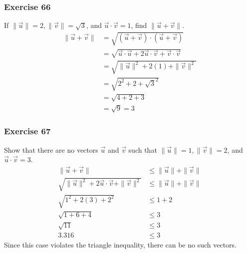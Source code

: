 \documentclass{math}
\begin{document}
\subsubsection*{Exercise 66}
If \( \|\vec{u}\| = 2, \|\vec{v}\| = \sqrt{3} \), and \( \vec{u}\cdot\vec{v} =
1 \), find \( \|\vec{u}+\vec{v}\| \).
\begin{align*}
  \|\vec{u}+\vec{v}\| &= \sqrt{(\vec{u}+\vec{v})\cdot(\vec{u}+\vec{v})} \\
  &= \sqrt{\vec{u}\cdot\vec{u}+2\vec{u}\cdot\vec{v}+\vec{v}\cdot\vec{v}} \\
  &= \sqrt{\|\vec{u}\|^2+2(1)+\|\vec{v}\|^2} \\
  &= \sqrt{2^2+2+\sqrt{3}^2} \\
  &= \sqrt{4+2+3} \\
  &= \sqrt{9} = 3
\end{align*}

\subsubsection*{Exercise 67}
Show that there are no vectors \( \vec{u} \) and \( \vec{v} \) such that
\( \|\vec{u}\| = 1, \|\vec{v}\| = 2 \), and \( \vec{u}\cdot\vec{v} = 3 \).
\begin{align*}
  \|\vec{u}+\vec{v}\| &\le \|\vec{u}\|+\|\vec{v}\| \\
  \sqrt{\|\vec{u}\|^2+2\vec{u}\cdot\vec{v}+\|\vec{v}\|^2} &\le
    \|\vec{u}\|+\|\vec{v}\| \\
  \sqrt{1^2+2(3)+2^2} &\le 1+2 \\
  \sqrt{1+6+4} &\le 3 \\
  \sqrt{11} &\le 3 \\
  3.316 &\le 3
\end{align*}
Since this case violates the triangle inequality, there can be no such vectors.
\end{document}
